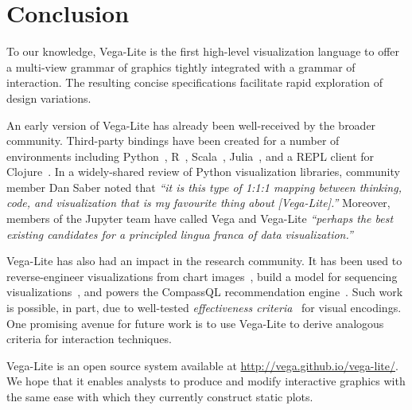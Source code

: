 \section{Conclusion}
\label{sec:vl:conclusion}

To our knowledge, Vega-Lite is the first high-level visualization language to
offer a multi-view grammar of graphics tightly integrated with a grammar of
interaction. The resulting concise specifications facilitate rapid exploration
of design variations.

An early version of Vega-Lite has already been well-received by the broader
community. Third-party bindings have been created for a number of environments
including Python~\cite{vega-lite:altair}, R~\cite{vega-lite:hrbrmstr,
vega-lite:timelyportfolio}, Scala~\cite{vega-lite:scala},
Julia~\cite{vega-lite:julia}, and a REPL client for
Clojure~\cite{vega-lite:clojure}. In a widely-shared review of Python
visualization libraries, community member Dan Saber noted that \emph{``it is
this type of 1:1:1 mapping between thinking, code, and visualization that is my
favourite thing about [Vega-Lite].''} Moreover, members of the Jupyter team have
called Vega and Vega-Lite \emph{``perhaps the best existing candidates for a
principled \emph{lingua franca} of data visualization.''}

Vega-Lite has also had an impact in the research community. It has been used to
reverse-engineer visualizations from chart images~\cite{poco:reverse}, build a
model for sequencing visualizations~\cite{kim:graphscape}, and powers the
CompassQL recommendation engine~\cite{voyager, compassql}. Such work is
possible, in part, due to well-tested \emph{effectiveness
criteria}~\cite{bertin:semiology, cleveland:perception, mackinlay:apt} for
visual encodings. One promising avenue for future work is to use Vega-Lite to
derive analogous criteria for interaction techniques.

Vega-Lite is an open source system available at
\url{http://vega.github.io/vega-lite/}. We hope that it enables analysts to
produce and modify interactive graphics with the same ease with which they
currently construct static plots.